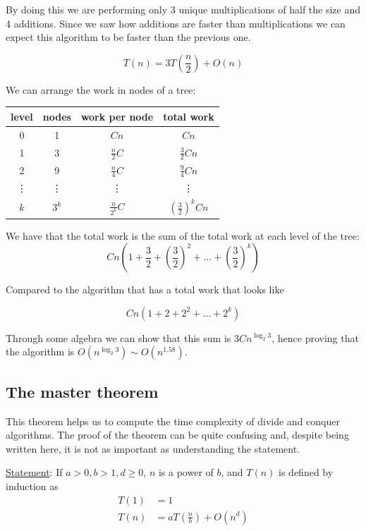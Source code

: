 \documentclass[12pt]{extarticle}
\begin{document}
By doing this we are performing only 3 unique multiplications of half the size and 4 additions.
Since we saw how additions are faster than multiplications we can expect this algorithm to be faster than the previous one.

$$
    T(n) = 3T\left(\frac{n}{2}\right) + O(n)
$$

We can arrange the work in nodes of a tree:

\begin{center}
    \begin{tabular}{ |c|c|c|c| }
        \hline
        level  & nodes  & work per node    & total work                      \\
        \hline
        0      & 1      & $Cn$             & $Cn$                            \\
        1      & 3      & $\frac{n}{2}C$   & $\frac{3}{2}Cn$                 \\
        2      & 9      & $\frac{n}{4}C$   & $\frac{9}{4}Cn$                 \\
        \vdots & \vdots & \vdots           & \vdots                          \\
        $k$    & $3^k$  & $\frac{n}{2^k}C$ & $\left(\frac{3}{2}\right)^k Cn$ \\
        \hline
    \end{tabular}
\end{center}

We have that the total work is the sum of the total work at each level of the tree:
$$
    Cn\left(1+\frac{3}{2}+\left(\frac{3}{2}\right)^2+\dots+\left(\frac{3}{2}\right)^k\right)
$$

Compared to the  algorithm that has a total work that looks like

$$
    Cn\left(1+2+2^2+\dots+2^k\right)
$$

Through some algebra we can show that this sum is $3Cn^{\log_{2}3}$,
hence proving that the algorithm is $O(n^{\log_{2}3}) \sim O(n^{1.58})$.

\subsection{The master theorem}

This theorem helps us to compute the time complexity of divide and conquer algorithms.
The proof of the theorem can be quite confusing and, despite being written here, it is not as important as understanding the statement.

\underline{Statement}: If $a > 0, b > 1, d \ge 0$, $n$ is a power of $b$, and
$T(n)$ is defined by induction as
\begin{align*}
    T(1) & = 1                                   \\
    T(n) & = aT\left(\frac{n}{b}\right) + O(n^d)
\end{align*}
\end{document}
